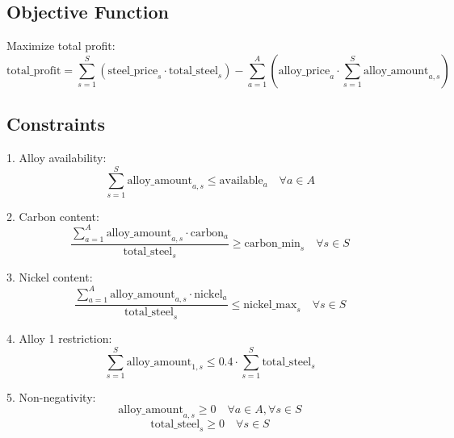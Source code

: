 \documentclass{article}
\begin{document}
\subsection*{Objective Function}
Maximize total profit:
\[
\text{total\_profit} = \sum_{s=1}^{S} \left( \text{steel\_price}_{s} \cdot \text{total\_steel}_{s} \right) - \sum_{a=1}^{A} \left( \text{alloy\_price}_{a} \cdot \sum_{s=1}^{S} \text{alloy\_amount}_{a,s} \right)
\]

\subsection*{Constraints}
1. Alloy availability:
\[
\sum_{s=1}^{S} \text{alloy\_amount}_{a,s} \leq \text{available}_a \quad \forall a \in A
\]

2. Carbon content:
\[
\frac{\sum_{a=1}^{A} \text{alloy\_amount}_{a,s} \cdot \text{carbon}_{a}}{\text{total\_steel}_{s}} \geq \text{carbon\_min}_{s} \quad \forall s \in S
\]

3. Nickel content:
\[
\frac{\sum_{a=1}^{A} \text{alloy\_amount}_{a,s} \cdot \text{nickel}_{a}}{\text{total\_steel}_{s}} \leq \text{nickel\_max}_{s} \quad \forall s \in S
\]

4. Alloy 1 restriction:
\[
\sum_{s=1}^{S} \text{alloy\_amount}_{1,s} \leq 0.4 \cdot \sum_{s=1}^{S} \text{total\_steel}_{s}
\]

5. Non-negativity:
\[
\text{alloy\_amount}_{a,s} \geq 0 \quad \forall a \in A, \forall s \in S
\]
\[
\text{total\_steel}_{s} \geq 0 \quad \forall s \in S
\]
\end{document}

